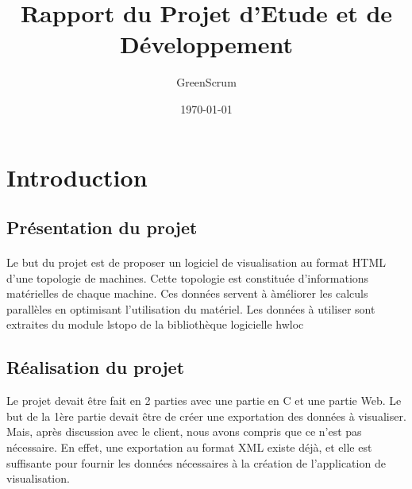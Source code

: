 \documentclass[12pt]{article}
\begin{document}
\title{Rapport du Projet d'Etude et de Développement}
\author{GreenScrum}
\date{\today}

\maketitle

\section{Introduction}
\subsection{Présentation du projet}
\paragraph{}
	Le but du projet est de proposer un logiciel de visualisation au format HTML d'une topologie de machines. Cette topologie est constituée d'informations matérielles de chaque machine. Ces données servent à àméliorer les calculs parallèles en optimisant l'utilisation du matériel. Les données à utiliser sont extraites du module lstopo de la bibliothèque logicielle hwloc

\subsection{Réalisation du projet}
Le projet devait être fait en 2 parties avec une partie en C et une partie Web. Le but de la 1ère partie devait être de créer une exportation des données à visualiser. Mais, après discussion avec le client, nous avons compris que ce n'est pas nécessaire. En effet, une exportation au format XML existe déjà, et elle est suffisante pour fournir les données nécessaires à la création de l'application de visualisation.
\end{document}

